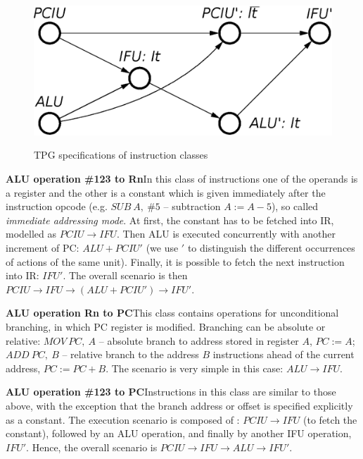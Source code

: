 \begin{figure}
\begin{centering}
{\includegraphics[scale=0.36]{fig/po_CALU_123_PC}}
\par\end{centering}

\caption{TPG specifications of instruction classes\label{app-fig-Scenarios-of-8}}
\vspace{-6mm}
\end{figure}


\textbf{ALU operation \#123 to Rn}\quad{}In this class of instructions
one of the operands is a register and the other is a constant which
is given immediately after the instruction opcode (e.g. $\mathit{SUB\ A,\ \#5}$
-- subtraction $A:=A-5$), so called \emph{immediate addressing mode}.
At first, the constant has to be fetched into IR, modelled as $\mathit{PCIU}\rightarrow\mathit{IFU}$.
Then ALU is executed concurrently with another increment of PC: $\mathit{ALU}+\mathit{PCIU'}$
(we use $'$ to distinguish the different occurrences of actions of
the same unit). Finally, it is possible to fetch the next instruction
into IR: $\mathit{IFU'}$. The overall scenario is then $\mathit{PCIU}\rightarrow\mathit{IFU}\rightarrow(\mathit{ALU}+\mathit{PCIU'})\rightarrow\mathit{IFU'}$.

\textbf{ALU operation Rn to PC}\quad{}This class contains operations
for unconditional branching, in which PC register is modified. Branching
can be absolute or relative: $\mathit{MOV\ PC,\ A}$ -- absolute branch
to address stored in register $A$, $PC:=A$; $\mathit{ADD\ PC,\ B}$
-- relative branch to the address $B$ instructions ahead of the current
address, $PC:=PC+B$. The scenario is very simple in this case: $\mathit{ALU}\rightarrow\mathit{IFU}$.

\textbf{ALU operation \#123 to PC}\quad{}Instructions in this class
are similar to those above, with the exception that the branch address
or offset is specified explicitly as a constant. The execution scenario
is composed of : $\mathit{PCIU}\rightarrow\mathit{IFU}$ (to fetch
the constant), followed by an ALU operation, and finally by another
IFU operation, $\mathit{IFU'}$. Hence, the overall scenario is $\mathit{PCIU}\rightarrow\mathit{IFU}\rightarrow\mathit{ALU}\rightarrow\mathit{IFU'}$.

